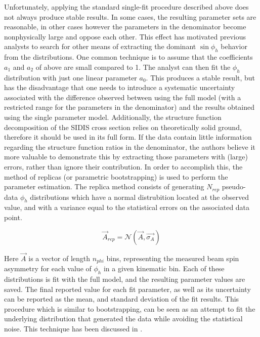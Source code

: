 Unfortunately, applying the standard single-fit procedure described above does not always produce stable results.  In some cases, the resulting parameter sets are reasonable, in other cases however the parameters in the denominator become nonphysically large and oppose each other.  This effect has motivated previous analysts to search for other means of extracting the dominant $\sin\phi_h$ behavior from the distributions.  One common technique is to assume that the coefficients $a_1$ and $a_2$ of above are small compared to 1.  The analyst can then fit the $\phi_h$ distribution with just one linear parameter $a_0$.  This produces a stable result, but has the disadvantage that one needs to introduce a systematic uncertainty associated with the difference observed between using the full model (with a restricted range for the parameters in the denominator) and the results obtained using the single parameter model.  Additionally, the structure function decomposition of the SIDIS cross section relies on theoretically solid ground, therefore it should be used in its full form.  If the data contain little information regarding the structure function ratios in the denominator, the authors believe it more valuable to demonstrate this by extracting those parameters with (large) errors, rather than ignore their contribution.  In order to accomplish this, the method of replicas (or parametric bootstrapping) is used to perform the parameter estimation.  The replica method consists of generating $N_{rep}$ pseudo-data $\phi_h$ distributions which have a normal distrubition located at the observed value, and with a variance equal to the statistical errors on the associated data point.  

\begin{equation}
  \vec{A}_{rep} = \mathcal{N}(\vec{A}, \vec{\sigma_{A}})
\end{equation}

Here $\vec{A}$ is a vector of length $n_{phi}$ bins, representing the measured beam spin asymmetry for each value of $\phi_h$ in a given kinematic bin.  Each of these distributions is fit with the full model, and the resulting parameter values are saved.  The final reported value for each fit parameter, as well as its uncertainty can be reported as the mean, and standard deviation of the fit results.  This procedure which is similar to bootstrapping, can be seen as an attempt to fit the underlying distribution that generated the data while avoiding the statistical noise.  This technique has been discussed in \cite{computing-watt:2012}.

